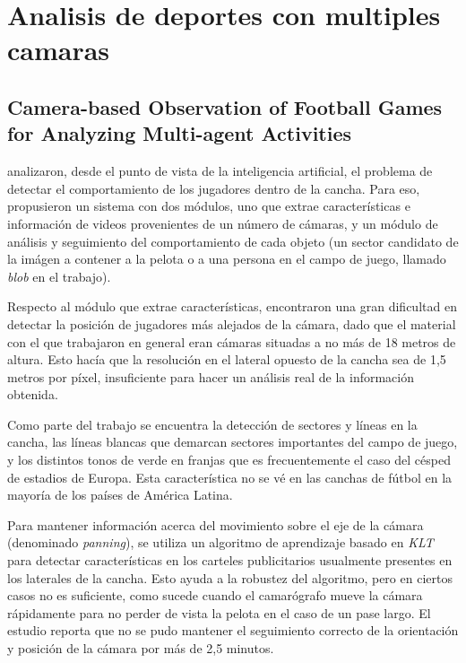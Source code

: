 \documentclass[a4paper,10pt]{article}
\begin{document}
\section{Analisis de deportes con multiples camaras}
\label{sec:var-camaras}

\subsection{Camera-based Observation of Football Games for Analyzing Multi-agent Activities}

\citeauthor*{beetz-05} analizaron, desde el punto de vista de la inteligencia
artificial, el problema de detectar el comportamiento de los jugadores dentro
de la cancha. Para eso, propusieron un sistema con dos módulos, uno que extrae
características e información de videos provenientes de un número de cámaras, y
un módulo de análisis y seguimiento del comportamiento de cada objeto (un
sector candidato de la imágen a contener a la pelota o a una persona en el campo de
juego, llamado \textit{blob} en el trabajo).

Respecto al módulo que extrae características, encontraron una gran dificultad
en detectar la posición de jugadores más alejados de la cámara, dado que el
material con el que trabajaron en general eran cámaras situadas a no más de 18
metros de altura. Esto hacía que la resolución en el lateral opuesto de la
cancha sea de 1,5 metros por píxel, insuficiente para hacer un análisis real de
la información obtenida.

Como parte del trabajo se encuentra la detección de sectores y líneas en la
cancha, las líneas blancas que demarcan sectores importantes del campo de
juego, y los distintos tonos de verde en franjas que es frecuentemente el caso
del césped de estadios de Europa. Esta característica no se vé en las canchas
de fútbol en la mayoría de los países de América Latina.

Para mantener información acerca del movimiento sobre el eje de la cámara
(denominado \textit{panning}), se utiliza un algoritmo de aprendizaje basado en
\textit{KLT} para detectar características en los carteles publicitarios
usualmente presentes en los laterales de la cancha. Esto ayuda a la robustez
del algoritmo, pero en ciertos casos no es suficiente, como sucede cuando el
camarógrafo mueve la cámara rápidamente para no perder de vista la pelota en el
caso de un pase largo. El estudio reporta que no se pudo mantener el seguimiento
correcto de la orientación y posición de la cámara por más de 2,5 minutos.
\end{document}
